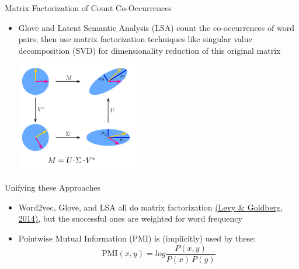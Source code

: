 \documentclass[xcolor=pdftex,x11names,table,hyperref]{beamer}
\begin{document}
\begin{frame}{Matrix Factorization of Count Co-Occurrences}
\begin{itemize}
	\item Glove and Latent Semantic Analysis (LSA) count the co-occurrences of word pairs, then use matrix factorization techniques like singular value decomposition (SVD) for dimensionality reduction of this original matrix \\
		\begin{center}
		\includegraphics[width=0.42\textwidth]{images/singular-value-decomposition_from_wp.png} 
		\end{center}
\end{itemize}
\end{frame}

\begin{frame}{Unifying these Approaches}
\begin{itemize}
	\item Word2vec, Glove, and LSA all do matrix factorization \href{https://levyomer.files.wordpress.com/2014/09/neural-word-embeddings-as-implicit-matrix-factorization.pdf}{(Levy \& Goldberg, 2014)}, but the successful ones are weighted for word frequency
	\item Pointwise Mutual Information (PMI) is (implicitly) used by these:
		\begin{equation*}
			\text{PMI}(x,y) = log \frac{P(x,y)}{P(x) \, P(y)}
		\end{equation*}
\end{itemize}
\end{frame}


\end{document}
